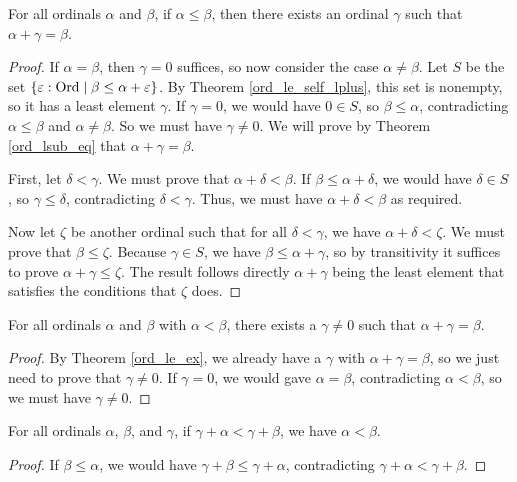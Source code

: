 \documentclass[../../math.tex]{subfiles}
\begin{document}
\begin{theorem} \label{ord_le_ex}
    For all ordinals $\alpha$ and $\beta$, if $\alpha \leq \beta$, then there
    exists an ordinal $\gamma$ such that $\alpha + \gamma = \beta$.
\end{theorem}
\begin{proof}
    If $\alpha = \beta$, then $\gamma = 0$ suffices, so now consider the case
    $\alpha \neq \beta$.  Let $S$ be the set $\{\varepsilon : \operatorname{Ord} \mid \beta
    \leq \alpha + \varepsilon\}$.  By Theorem \ref{ord_le_self_lplus}, this set
    is nonempty, so it has a least element $\gamma$.  If $\gamma = 0$, we would
    have $0 \in S$, so $\beta \leq \alpha$, contradicting $\alpha \leq \beta$
    and $\alpha \neq \beta$.  So we must have $\gamma \neq 0$.  We will prove by
    Theorem \ref{ord_lsub_eq} that $\alpha + \gamma = \beta$.

    First, let $\delta < \gamma$.  We must prove that $\alpha + \delta < \beta$.
    If $\beta \leq \alpha + \delta$, we would have $\delta \in S$, so $\gamma
    \leq \delta$, contradicting $\delta < \gamma$.  Thus, we must have $\alpha +
    \delta < \beta$ as required.

    Now let $\zeta$ be another ordinal such that for all $\delta < \gamma$, we
    have $\alpha + \delta < \zeta$.  We must prove that $\beta \leq \zeta$.
    Because $\gamma \in S$, we have $\beta \leq \alpha + \gamma$, so by
    transitivity it suffices to prove $\alpha + \gamma \leq \zeta$.  The result
    follows directly $\alpha + \gamma$ being the least element that satisfies
    the conditions that $\zeta$ does.
\end{proof}

\begin{theorem} \label{ord_lt_ex}
    For all ordinals $\alpha$ and $\beta$ with $\alpha < \beta$, there exists a
    $\gamma \neq 0$ such that $\alpha + \gamma = \beta$.
\end{theorem}
\begin{proof}
    By Theorem \ref{ord_le_ex}, we already have a $\gamma$ with $\alpha + \gamma
    = \beta$, so we just need to prove that $\gamma \neq 0$.  If $\gamma = 0$,
    we would gave $\alpha = \beta$, contradicting $\alpha < \beta$, so we must
    have $\gamma \neq 0$.
\end{proof}

\begin{theorem} \label{ord_lt_plus_lcancel}
    For all ordinals $\alpha$, $\beta$, and $\gamma$, if $\gamma + \alpha <
    \gamma + \beta$, we have $\alpha < \beta$.
\end{theorem}
\begin{proof}
    If $\beta \leq \alpha$, we would have $\gamma + \beta \leq \gamma + \alpha$,
    contradicting $\gamma + \alpha < \gamma + \beta$.
\end{proof}
\end{document}
